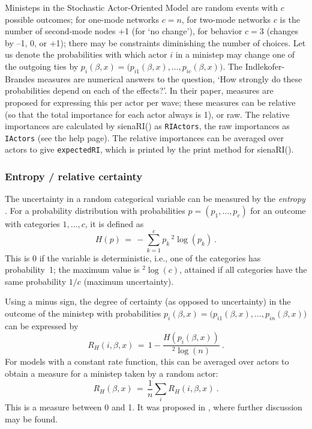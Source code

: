 \documentclass[a4paper,fleqn,11pt]{article}
\newcommand{\+}{\, + \,}
\newcommand{\sfn}[1]{\textsf{#1}}
\newcommand{\saom}{{Stochastic Actor-Oriented Model}}
\begin{document}
Ministeps in the {\saom} are random events with $c$ possible outcomes;
for one-mode networks $c=n$, for two-mode networks $c$ is the
number of second-mode nodes +1 (for `no change'), for behavior
$c=3$ (changes by --1, 0, or +1); there may be constraints
diminishing the number of choices.
Let us denote the probabilities with which
actor $i$ in a ministep may change one of the outgoing ties by
$p_{i}(\beta, x) = \big(p_{i1}(\beta, x), \ldots, p_{ic}(\beta, x)\big)$.
The Indlekofer-Brandes measures are numerical answers to the question,
`How strongly do these probabilities depend on each of the effects?'.
In their paper, measures are proposed for expressing this per actor
per wave; these measures can be relative (so that the total importance
for each actor always is 1), or raw.
The relative importances are calculated by  \sfn{sienaRI()} as \texttt{RIActors},
the raw importances as \texttt{IActors} (see the help page).
The  relative importances can be averaged over actors to give
\texttt{expectedRI}, which is printed by the print method for \sfn{sienaRI()}.

\subsubsection{Entropy / relative certainty}

The uncertainty in a random categorical variable
can be measured by the \emph{entropy} \citep{Shannon1948}. For a probability
distribution with probabilities $p = (p_1, \ldots, p_c)$ for
an outcome with categories $1, \ldots, c$, it is defined as
\begin{equation}\label{entropy}
  H(p) \,=\, - \sum_{k=1}^c p_k {}\,^2 \log(p_k) \ .
\end{equation}
This is 0 if the variable is deterministic, i.e., one of the categories
has probability~1; the maximum value is ${}^2 \log(c)$, attained if all
categories have the same probability $1/c$ (maximum uncertainty).

Using a minus sign, the degree of certainty (as opposed to uncertainty)
in the outcome of the ministep with probabilities
$p_{i}(\beta, x) = \big(p_{i1}(\beta, x), \ldots, p_{in}(\beta, x)\big)$
can be expressed by
\begin{equation}\label{uncertainty}
  R_H(i,\beta, x) \,=\,  1 - \frac{H(p_{i}(\beta, x))}{{}^2 \log(n)} \ .
\end{equation}
For models with a constant rate function, this can be averaged over
actors to obtain a measure for a ministep taken by a random actor:
\begin{equation}\label{explained}
  R_H(\beta, x) \,=\, \frac1n \sum_i R_H(i,\beta, x) \ .
\end{equation}
This is a measure between 0 and 1.
It was proposed in \citet{Snijders04}, where further discussion may be found.
\end{document}
